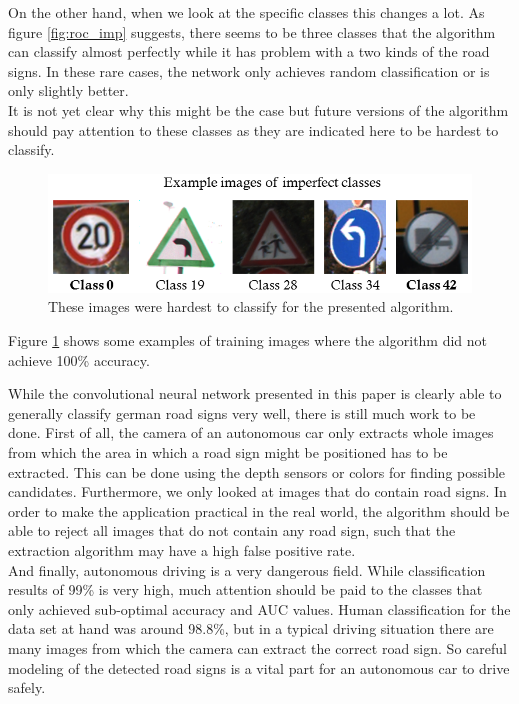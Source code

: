 \documentclass[11pt,a4paper]{article}
\begin{document}
On the other hand, when we look at the specific classes this changes a lot. As figure \ref{fig:roc_imp} suggests, there seems to be three classes that the algorithm can classify almost perfectly while it has problem with a two kinds of the road signs. In these rare cases, the network only achieves random classification or is only slightly better.\\
It is not yet clear why this might be the case but future versions of the algorithm should pay attention to these classes as they are indicated here to be hardest to classify.\\
\begin{figure}[h!]
	\includegraphics[width=\textwidth]{imperfect_classes.png}
	\centering
	\caption[Example images of hardest classes]{These images were hardest to classify for the presented algorithm.}
	\label{fig:imperfect_images}
\end{figure}
Figure \ref{fig:imperfect_images} shows some examples of training images where the algorithm did not achieve 100\% accuracy.

While the convolutional neural network presented in this paper is clearly able to generally classify german road signs very well, there is still much work to be done. First of all, the camera of an autonomous car only extracts whole images from which the area in which a road sign might be positioned has to be extracted. This can be done using the depth sensors or colors for finding possible candidates. Furthermore, we only looked at images that do contain road signs. In order to make the application practical in the real world, the algorithm should be able to reject all images that do not contain any road sign, such that the extraction algorithm may have a high false positive rate.\\
And finally, autonomous driving is a very dangerous field. While classification results of 99\% is very high, much attention should be paid to the classes that only achieved sub-optimal accuracy and AUC values. Human classification for the data set at hand was around 98.8\%, but in a typical driving situation there are many images from which the camera can extract the correct road sign. So careful modeling of the detected road signs is a vital part for an autonomous car to drive safely.
\newpage


\end{document}
